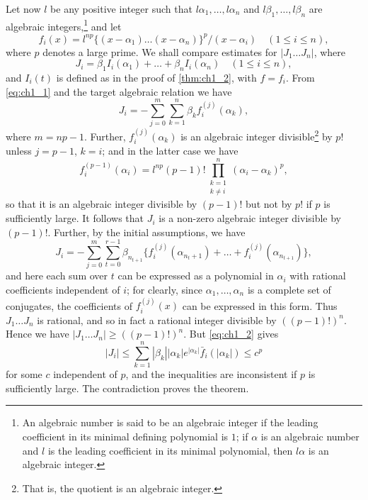 Let now $l$ be any positive integer such that $l\alpha_1, \dots, l\alpha_n$ and $l\beta_1, \dots, l\beta_n$ are algebraic integers,\footnote{An algebraic number is said to be an algebraic integer if the leading coefficient in its minimal defining polynomial is $1$; if $\alpha$ is an algebraic number and $l$ is the leading coefficient in its minimal polynomial, then $l\alpha$ is an algebraic integer.} and let
\[
f_i(x) = l^{np} \{(x-\alpha_1)\dots(x-\alpha_n)\}^p/(x-\alpha_i) \quad (1 \le i \le n),
\]
where $p$ denotes a large prime. We shall compare estimates for $|J_1 \dots J_n|$, where
\[
J_{i} = \beta_{1} I_{i}(\alpha_{1}) + \dots + \beta_{n} I_{i}(\alpha_{n}) \quad (1 \le i \le n),
\]
and $I_i(t)$ is defined as in the proof of \autoref{thm:ch1_2}, with $f = f_i$. From \eqref{eq:ch1_1} and the target algebraic relation we have
\[
J_i = -\sum_{j=0}^m \sum_{k=1}^n \beta_k f_i^{(j)}(\alpha_k),
\]
where $m = np - 1$. Further, $f_i^{(j)}(\alpha_k)$ is an algebraic integer divisible\footnote{That is, the quotient is an algebraic integer.} by $p!$ unless $j = p - 1$, $k = i$; and in the latter case we have
\[
f_i^{(p-1)}(\alpha_i) = l^{np}(p-1)! \prod_{\substack{k=1 \\ k \neq i}}^n (\alpha_i - \alpha_k)^p,
\]
so that it is an algebraic integer divisible by $(p-1)!$ but not by $p!$ if $p$ is sufficiently large. It follows that $J_i$ is a non-zero algebraic integer divisible by $(p-1)!$. Further, by the initial assumptions, we have
\[
J_{i} = -\sum_{j=0}^{m} \sum_{t=0}^{r-1} \beta_{n_{t+1}} \{ f_{i}^{(j)}(\alpha_{n_t+1}) + \dots + f_{i}^{(j)}(\alpha_{n_{t+1}}) \},
\]
and here each sum over $t$ can be expressed as a polynomial in $\alpha_i$ with rational coefficients independent of $i$; for clearly, since $\alpha_1, \dots, \alpha_n$ is a complete set of conjugates, the coefficients of $f_i^{(j)}(x)$ can be expressed in this form. Thus $J_1 \dots J_n$ is rational, and so in fact a rational integer divisible by $((p-1)!)^n$. Hence we have $|J_1 \dots J_n| \ge ((p-1)!)^n$. But \eqref{eq:ch1_2} gives
\[
|J_i| \le \sum_{k=1}^n |\beta_k| |\alpha_k| e^{|\alpha_k|} \bar{f}_i(|\alpha_k|) \le c^p
\]
for some $c$ independent of $p$, and the inequalities are inconsistent if $p$ is sufficiently large. The contradiction proves the theorem.

